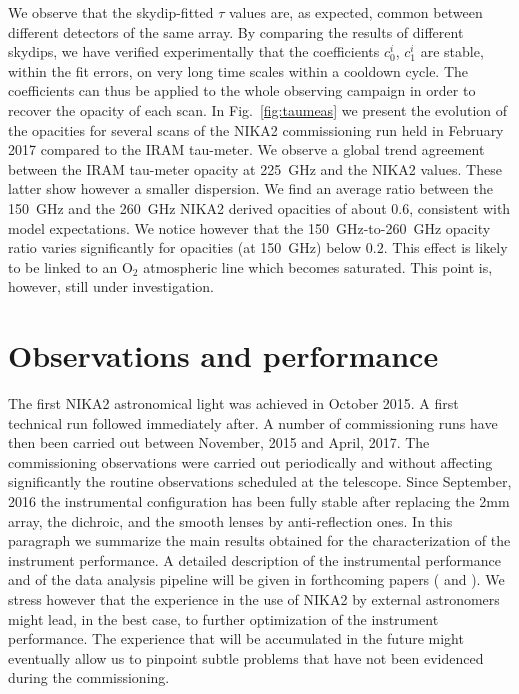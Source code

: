 \documentclass[]{aa} %
\begin{document}
We observe that the skydip-fitted $\tau$ values are, as expected, common between different detectors of the same array. By comparing the results of different skydips, we have verified experimentally that the coefficients $c^{i}_0$, $c^{i}_1$ are stable, within the fit errors, on very long time scales within a cooldown cycle. The coefficients can thus be applied to the whole observing campaign in order to recover the opacity of each scan. In Fig.~\ref{fig:taumeas} we present the evolution of the opacities for several scans of the NIKA2 commissioning run held in February 2017 compared to the IRAM tau-meter. We observe a global trend agreement between the IRAM tau-meter opacity at 225~GHz and the NIKA2 values. These latter show however a smaller dispersion. We find an average ratio between the 150~GHz and the 260~GHz NIKA2 derived opacities of about 0.6, consistent with model expectations. We notice however that the 150~GHz-to-260~GHz opacity ratio varies significantly for opacities (at 150~GHz) below $0.2$. This effect is likely to be linked to an O$_2$ atmospheric line which becomes saturated. This point is, however, still under investigation.

\section{Observations and performance}
\label{Observations and performance}

The first NIKA2 astronomical light was achieved in October 2015. A first technical run followed immediately after. A number of commissioning runs have then been carried out between November, 2015 and April, 2017. The commissioning observations were carried out periodically and without affecting significantly the routine observations scheduled at the telescope. Since September, 2016 the instrumental configuration has been fully stable after replacing the 2mm array, the dichroic, and the smooth lenses by anti-reflection ones.
In this paragraph we summarize the main results obtained for the characterization of the instrument performance. A detailed description of the instrumental performance and of the data analysis pipeline will be given in forthcoming papers (\cite{pipeline} and \cite{commissioning}). We stress however that the experience in the use of NIKA2 by external astronomers might lead, in the best case, to further optimization of the instrument performance. The experience that will be accumulated in the future might eventually allow us to pinpoint subtle problems that have not been evidenced during the commissioning. 
\end{document}
